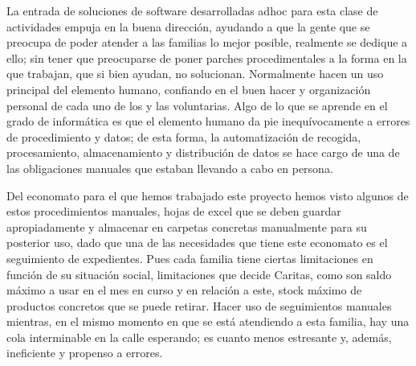 \vspace{1em}
\par La entrada de soluciones de software desarrolladas adhoc para esta clase de actividades empuja en la buena dirección, ayudando a que la gente que se preocupa de poder atender a las familias lo mejor posible, realmente se dedique a ello; sin tener que preocuparse de poner parches procedimentales a la forma en la que trabajan, que si bien ayudan, no solucionan. Normalmente hacen un uso principal del elemento humano, confiando en el buen hacer y organización personal de cada uno de los y las voluntarias. Algo de lo que se aprende en el grado de informática es que el elemento humano da pie inequívocamente a errores de procedimiento y datos; de esta forma, la automatización de recogida, procesamiento, almacenamiento y distribución de datos se hace cargo de una de las obligaciones manuales que estaban llevando a cabo en persona.
\vspace{1em}
\par Del economato para el que hemos trabajado este proyecto hemos visto algunos de estos procedimientos manuales, hojas de excel que se deben guardar apropiadamente y almacenar en carpetas concretas manualmente para su posterior uso, dado que una de las necesidades que tiene este economato es el seguimiento de expedientes. Pues cada familia tiene ciertas limitaciones en función de su situación social, limitaciones que decide Caritas, como son saldo máximo a usar en el mes en curso y en relación a este, stock máximo de productos concretos que se puede retirar. Hacer uso de seguimientos manuales mientras, en el mismo momento en que se está atendiendo a esta familia, hay una cola interminable en la calle esperando; es cuanto menos estresante y, además, ineficiente y propenso a errores.
\vspace{1em}
 
